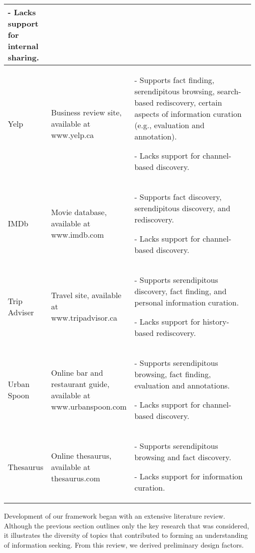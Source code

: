 \documentclass{casconpaper}
\begin{document}
{{\begin{table*}[htbp]
\begin{tabular}{|p{0.11\linewidth}| p{0.22\linewidth}| p{0.67\linewidth}|}
- Lacks support for internal sharing.                                                                                                                                                \\
\hline
Yelp            & \raggedright Business review site, available at www.yelp.ca                               & - Supports fact finding, serendipitous browsing, search-based rediscovery, certain aspects of information curation (e.g., evaluation and annotation).                                                                                                

 - Lacks support for channel-based discovery.   \\
\hline
IMDb            & \raggedright Movie database, available at www.imdb.com                                    & - Supports fact discovery, serendipitous discovery, and rediscovery. 

- Lacks support for channel-based discovery.                                                                                                                                                          \\
\hline
Trip Adviser    & \raggedright Travel site, available at www.tripadvisor.ca                                 & - Supports serendipitous discovery, fact finding, and personal information curation. 

- Lacks support for history-based rediscovery.                                                                                                                                 \\
\hline
Urban Spoon     & \raggedright Online bar and restaurant guide, available at www.urbanspoon.com             & 
- Supports serendipitous browsing, fact finding, evaluation and annotations. 

- Lacks support for channel-based discovery.  \\
\hline
Thesaurus       & \raggedright Online thesaurus, available at thesaurus.com                                 & - Supports serendipitous browsing and fact discovery. 

- Lacks support for information curation.                                                                                \\
\hline
\end{tabular}
\end{table*}
Development of our framework began with an extensive literature review. Although the previous section outlines only the key research that was considered, it illustrates the diversity of topics that contributed to forming an understanding of information seeking. From this review, we derived preliminary design factors. 

}}
\end{document}
